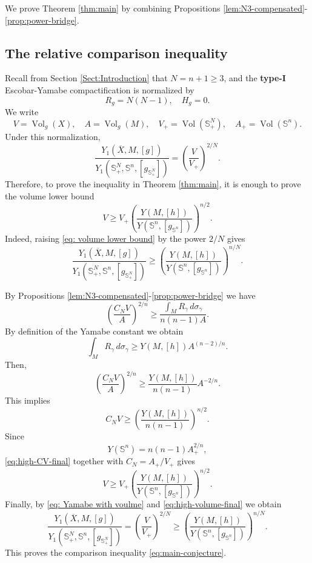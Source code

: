 \documentclass[11pt,letterpaper]{amsart}
\theoremstyle{definition}
\theoremstyle{remark}
\numberwithin{equation}{section}
\newcommand{\Sph}{\mathbb S}
\newcommand{\barX}{\overline X}
\begin{document}
We prove Theorem \ref{thm:main} by combining Propositions \ref{lem:N3-compensated}-\ref{prop:power-bridge}. 
\subsection{The relative comparison inequality}
Recall from Section \ref{Sect:Introduction} that $N=n+1 \geq 3$, and the \textbf{type-I} Escobar-Yamabe compactification is normalized by
\[
R_g=N(N-1), \quad H_g=0.
\]
We write
\[
V=\operatorname{Vol}_g(X), \quad A=\operatorname{Vol}_g(M), \quad V_{+}=\operatorname{Vol}\left(\Sph_{+}^N\right), \quad A_{+}=\operatorname{Vol}\left(\Sph^n\right).
\]
Under this normalization,
\begin{equation}\label{eq: Yamabe with voulme}
\frac{Y_1(\barX, M,[g])}{Y_1\left(\Sph_{+}^N, \Sph^n,[g_{\Sph_{+}^N}]\right)}=\left(\frac{V}{V_{+}}\right)^{2 / N} .
\end{equation}
Therefore, to prove the inequality in Theorem \ref{thm:main}, it is enough to prove the volume lower bound
\begin{equation}\label{eq: volume lower bound}
V \geq V_{+}\left(\frac{Y(M,[h])}{Y\left(\Sph^n,\left[g_{\Sph^n}\right]\right)}\right)^{n / 2}.
\end{equation}
Indeed, raising \eqref{eq: volume lower bound} by the power $2 / N$ gives 
\[
\frac{Y_1(\barX, M,[g])}{Y_1\left(\Sph_{+}^N, \Sph^n,[g_{\Sph_{+}^N}]\right)} \geq\left(\frac{Y(M,[h])}{Y(\Sph^n,[g_{\Sph^n}])}\right)^{n/N} .
\]

By Propositions \ref{lem:N3-compensated}-\ref{prop:power-bridge}  we have
\[
 \left(\frac{C_NV}{A}\right)^{2/n}
 \ge
 \frac{\int_MR_\gamma\,d\sigma_\gamma}{n(n-1)A}.
\]
By definition of the Yamabe constant  we obtain
\[
 \int_MR_\gamma\,d\sigma_\gamma\ge Y(M,[h])A^{(n-2)/n}.
\]
Then,
\begin{equation}\label{eq: high D 2}
 \left(\frac{C_NV}{A}\right)^{2/n}
 \ge
 \frac{Y(M,[h])}{n(n-1)}A^{-2/n}.
\end{equation}
This implies
\begin{equation}\label{eq:high-CV-final}
 C_NV\ge\left(\frac{Y(M,[h])}{n(n-1)}\right)^{n/2}.
\end{equation}
Since
\[
 Y(\Sph^n)=n(n-1)A_+^{2/n},
\]
\eqref{eq:high-CV-final} together with $C_N=A_+/V_+$ gives
\begin{equation}\label{eq:high-volume-final}
 V\ge V_+\left(\frac{Y(M,[h])}{Y(\Sph^n, [g_{\Sph^n}])}\right)^{n/2}.
\end{equation}
Finally, by \eqref{eq: Yamabe with voulme} and \eqref{eq:high-volume-final} we obtain
\[
 \frac{Y_1(\barX,M,[g])}{Y_1(\Sph^N_+,\Sph^n,[g_{\Sph_+^N}])}
 =\left(\frac{V}{V_+}\right)^{2/N}
 \ge
 \left(\frac{Y(M,[h])}{Y(\Sph^n, [g_{\Sph^n}])}\right)^{n/N}.
\]
This proves the comparison inequality \eqref{eq:main-conjecture}.
\end{document}

